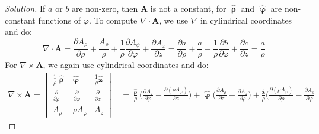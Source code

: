 \documentclass[crop=false,class=article,oneside]{standalone}
\begin{document}
        \begin{proof}[Solution]
            If $a$ or $b$ are non-zero, then $\mathbf{A}$
            is not a constant, for
            $\hat{\boldsymbol{\uprho}}$ and
            $\hat{\boldsymbol{\upvarphi}}$ are
            non-constant functions of $\varphi$. To compute
            $\nabla\cdot\mathbf{A}$, we use $\nabla$ in
            cylindrical coordinates and do:
            \begin{equation*}
                \nabla\cdot\mathbf{A}
                =\frac{\partial{A_{\rho}}}{\partial\rho}
                +\frac{A_{\rho}}{\rho}
                +\frac{1}{\rho}
                 \frac{\partial{A_{\phi}}}{\partial\varphi}
                +\frac{\partial{A_{z}}}{\partial{z}}
                =\frac{\partial{a}}{\partial\rho}
                +\frac{a}{\rho}
                +\frac{1}{\rho}
                 \frac{\partial{b}}{\partial\varphi}
                +\frac{\partial{c}}{\partial{z}}
                =\frac{a}{\rho}
            \end{equation*}
            For $\nabla\times\mathbf{A}$,
            we again use cylindrical coordinates and do:
            \begin{align*}
                \nabla\times\mathbf{A}
                =
                \begin{vmatrix}
                    \frac{1}{\rho}\hat{\boldsymbol{\uprho}}
                    &\hat{\boldsymbol{\upvarphi}}
                    &\frac{1}{\rho}\hat{\mathbf{z}}\\
                    \frac{\partial}{\partial\rho}
                    &\frac{\partial}{\partial\varphi}
                    &\frac{\partial}{\partial{z}}\\
                    A_{\rho}
                    &\rho{A_{\varphi}}
                    &A_{z}
                \end{vmatrix}
                &=\frac{\hat{\boldsymbol{\uprho}}}{\rho}\bigg(
                    \frac{\partial{A_{z}}}{\partial\varphi}
                    -\frac{\partial(\rho{A_{\varphi}})}
                          {\partial{z}}
                \bigg)
                +\hat{\boldsymbol{\upvarphi}}\bigg(
                    \frac{\partial{A_{\rho}}}{\partial{z}}
                    -\frac{\partial{A_{z}}}{\partial\rho}
                \bigg)
                +\frac{\hat{\mathbf{z}}}{\rho}\bigg(
                    \frac{\partial(\rho{A_{\varphi}})}
                         {\partial\rho}
                    -\frac{\partial{A_{\rho}}}
                          {\partial\varphi}

\end{align*}
\end{proof}
\end{document}
